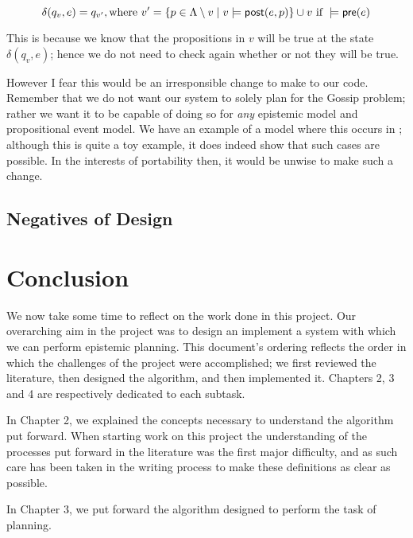 \documentclass[12pt, a4paper]{article}
\begin{document}
\begin{equation} \label{eq:delta2}
  \delta(q_v, e) = q_{v'}, \text{where } v' = \{p \in \Lambda \setminus v \mid v \models \textsf{post}(e, p)\} \cup v
  \text{ if } 
  \models \textsf{pre}(e)
\end{equation}

This is because we know that the propositions in $v$ will be true at the state
$\delta(q_v, e)$; hence we do not need to check again whether or not they will
be true. 

However I fear this would be an irresponsible change to make to our code.
Remember that we do not want our system to solely plan for the Gossip problem;
rather we want it to be capable of doing so for \textit{any} epistemic model and
propositional event model. We have an example of a model where this occurs in
; although this is quite a toy example, it does indeed show
that such cases are possible. In the interests of portability then, it would be
unwise to make such a change. 

\subsection{Negatives of Design}

\newpage

\section{Conclusion}

We now take some time to reflect on the work done in this project. Our
overarching aim in the project was to design an implement a system with which we
can perform epistemic planning. This document's ordering reflects the order in
which the challenges of the project were accomplished; we first reviewed the
literature, then designed the algorithm, and then implemented it. Chapters 2, 3
and 4 are respectively dedicated to each subtask.

\bigskip

In Chapter 2, we explained the concepts necessary to understand the algorithm
put forward. When starting work on this project the understanding of the
processes put forward in the literature was the first major difficulty, and as
such care has been taken in the writing process to make these definitions as clear
as possible. 

\bigskip

In Chapter 3, we put forward the algorithm designed to perform the task of
planning. 
\end{document}
